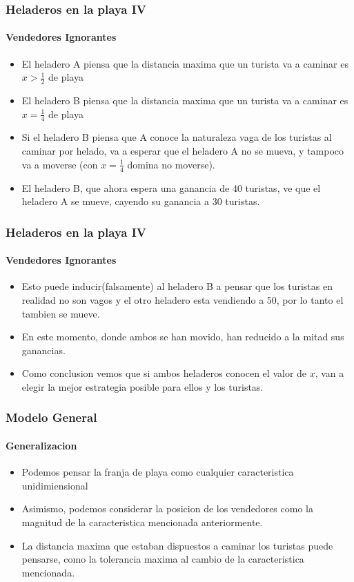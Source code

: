 \documentclass{beamer}
\begin{document}
\begin{frame}
  \frametitle{Heladeros en la playa IV}
  \framesubtitle{Vendedores Ignorantes}
  \begin{itemize}
    \setlength{\itemsep}{4pt}
    \item El heladero A piensa que la distancia maxima que un turista va a caminar es $x > \frac{1}{2}$ de playa
    \pause
    \item El heladero B piensa que la distancia maxima que un turista va a caminar es $x = \frac{1}{4}$ de playa
    \pause    
    \item Si el heladero B piensa que A conoce la naturaleza vaga de los turistas al caminar por helado, va a esperar que el heladero A no se mueva, y tampoco va a moverse (con $x = \frac{1}{4}$ domina no moverse).
    \pause
    \item El heladero B, que ahora espera una ganancia de 40 turistas, ve que el heladero A se mueve, cayendo su ganancia a 30 turistas.
  \end{itemize}
\end{frame}

\begin{frame}
  \frametitle{Heladeros en la playa IV}
  \framesubtitle{Vendedores Ignorantes}
  \begin{itemize}
    \setlength{\itemsep}{4pt}
    \item Esto puede inducir(falsamente) al heladero B a pensar que los turistas en realidad no son vagos y el otro heladero esta vendiendo a 50, por lo tanto el tambien se mueve.
    \pause
    \item En este momento, donde ambos se han movido, han reducido a la mitad sus ganancias.
    \pause
    \item Como conclusion vemos que si ambos heladeros conocen el valor de $x$, van a elegir la mejor estrategia posible para ellos y los turistas.
  \end{itemize}
\end{frame}

\begin{frame}
  \frametitle{Modelo General}
  \framesubtitle{Generalizacion}
  \begin{itemize}
    \setlength{\itemsep}{4pt}
    \item Podemos pensar la franja de playa como cualquier caracteristica unidimiensional
    \pause
    \item Asimismo, podemos considerar la posicion de los vendedores como la magnitud de la caracteristica mencionada anteriormente.
    \pause 
    \item La distancia maxima que estaban dispuestos a caminar los turistas puede pensarse, como la tolerancia maxima al cambio de la caracteristica mencionada.
  \end{itemize}
\end{frame}
\end{document}
